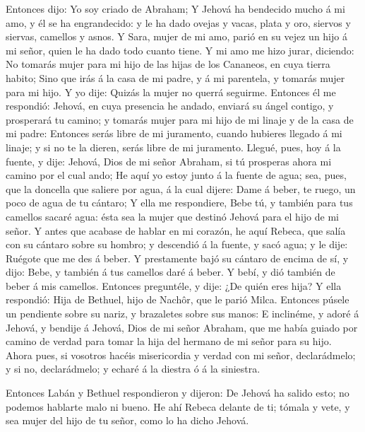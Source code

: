  Entonces dijo: Yo soy criado de Abraham;  Y
Jehová ha bendecido mucho á mi amo, y él se ha engrandecido: y le ha
dado ovejas y vacas, plata y oro, siervos y siervas, camellos y asnos.
 Y Sara, mujer de mi amo, parió en su vejez un hijo á mi
señor, quien le ha dado todo cuanto tiene.  Y mi amo me
hizo jurar, diciendo: No tomarás mujer para mi hijo de las hijas de los
Cananeos, en cuya tierra habito;  Sino que irás á la casa
de mi padre, y á mi parentela, y tomarás mujer para mi hijo.
 Y yo dije: Quizás la mujer no querrá seguirme.
 Entonces él me respondió: Jehová, en cuya presencia he
andado, enviará su ángel contigo, y prosperará tu camino; y tomarás
mujer para mi hijo de mi linaje y de la casa de mi padre: 
Entonces serás libre de mi juramento, cuando hubieres llegado á mi
linaje; y si no te la dieren, serás libre de mi juramento. 
Llegué, pues, hoy á la fuente, y dije: Jehová, Dios de mi señor Abraham,
si tú prosperas ahora mi camino por el cual ando;  He aquí
yo estoy junto á la fuente de agua; sea, pues, que la doncella que
saliere por agua, á la cual dijere: Dame á beber, te ruego, un poco de
agua de tu cántaro;  Y ella me respondiere, Bebe tú, y
también para tus camellos sacaré agua: ésta sea la mujer que destinó
Jehová para el hijo de mi señor.  Y antes que acabase de
hablar en mi corazón, he aquí Rebeca, que salía con su cántaro sobre su
hombro; y descendió á la fuente, y sacó agua; y le dije: Ruégote que me
des á beber.  Y prestamente bajó su cántaro de encima de
sí, y dijo: Bebe, y también á tus camellos daré á beber. Y bebí, y dió
también de beber á mis camellos.  Entonces preguntéle, y
dije: ¿De quién eres hija? Y ella respondió: Hija de Bethuel, hijo de
Nachôr, que le parió Milca. Entonces púsele un pendiente sobre su nariz,
y brazaletes sobre sus manos:  E inclinéme, y adoré á
Jehová, y bendije á Jehová, Dios de mi señor Abraham, que me había
guiado por camino de verdad para tomar la hija del hermano de mi señor
para su hijo.  Ahora pues, si vosotros hacéis misericordia
y verdad con mi señor, declarádmelo; y si no, declarádmelo; y echaré á
la diestra ó á la siniestra.

 Entonces Labán y Bethuel respondieron y dijeron: De Jehová
ha salido esto; no podemos hablarte malo ni bueno.  He ahí
Rebeca delante de ti; tómala y vete, y sea mujer del hijo de tu señor,
como lo ha dicho Jehová.


